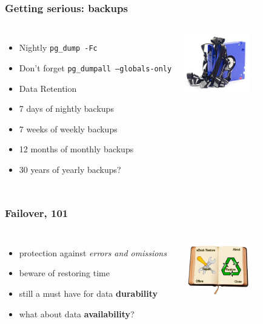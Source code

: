 \documentclass[english]{beamer}
\begin{document}
\begin{frame}[fragile]
  \frametitle{Getting serious: backups}


\begin{columns}[c]

  \begin{itemize}
   \item<1-> Nightly \texttt{pg\_dump -Fc}
   \item<1-> Don't forget \texttt{pg\_dumpall --globals-only}
   \item<2-> Data Retention
   \item<2-> 7 days of nightly backups
   \item<2-> 7 weeks of weekly backups
   \item<2-> 12 months of monthly backups
   \item<3-> 30 years of yearly backups?
  \end{itemize}  

\includegraphics[height=7em]{online-backup.jpg}
\end{columns}
\end{frame}

\begin{frame}[fragile]
  \frametitle{Failover, 101}

  \vbreak

\begin{columns}[c]

  \begin{itemize}
    \item<1-> protection against \textit{errors and omissions}
    \item<1-> beware of restoring time
    \item<2-> still a must have for data \textbf{durability}
    \item<2-> what about data \textbf{availability}?
  \end{itemize}

\includegraphics[height=7em]{restore.png}
\end{columns}
\end{frame}
\end{document}
